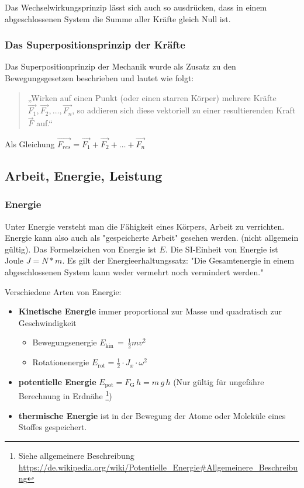\documentclass[../document.tex]{subfiles}
\begin{document}
Das Wechselwirkungsprinzip lässt sich auch so ausdrücken, dass in einem abgeschlossenen System die Summe aller Kräfte gleich Null ist.

\subsubsection {Das Superpositionsprinzip der Kräfte}

Das Superpositionprinzip der Mechanik wurde als Zusatz zu den Bewegungsgesetzen beschrieben und lautet wie folgt:

\begin{quote}
„Wirken auf einen Punkt (oder einen starren Körper) mehrere Kräfte ${\vec  {F_{1}}},{\vec  {F_{2}}},\dots,{\vec  {F_{n}}}$, so addieren sich diese vektoriell zu einer resultierenden Kraft ${\vec {F}}$ auf.“
\end{quote}

Als Gleichung $\vec{F_{{res}}}=\vec  {F_{1}}+\vec  {F_{2}}+\dots+\vec  {F_{n}}$


\subsection{Arbeit, Energie, Leistung}
\subsubsection{Energie}

Unter Energie versteht man die Fähigkeit eines Körpers, Arbeit zu verrichten. Energie kann also auch als "gespeicherte Arbeit" gesehen werden. (nicht allgemein gültig). Das Formelzeichen von Energie ist $E$. Die SI-Einheit von Energie ist Joule $J = N * m$. Es gilt der Energieerhaltungssatz: "Die Gesamtenergie in einem abgeschlossenen System kann weder vermehrt noch vermindert werden."

Verschiedene Arten von Energie:
\begin{itemize}
 \item \textbf{Kinetische Energie} immer proportional zur Masse und quadratisch zur Geschwindigkeit
 \begin{itemize}
  \item Bewegungsenergie $E_{\mathrm {kin} }\,=\,{\frac {1}{2}}mv^{2}\,$
  \item Rotationenergie  $E_{\mathrm {rot} }={\frac {1}{2}}\cdot J_{x}\cdot \omega ^{2}$
 \end{itemize}
 \item \textbf{potentielle Energie} $E_{{\mathrm  {pot}}}=F_{{\mathrm  G}}\,h=m\,g\,h$ (Nur gültig für ungefähre Berechnung in Erdnähe \footnote{Siehe allgemeinere Beschreibung \url{https://de.wikipedia.org/wiki/Potentielle\_Energie\#Allgemeinere\_Beschreibung}})
 \item \textbf{thermische Energie} ist in der Bewegung der Atome oder Moleküle eines Stoffes gespeichert. 
\end{itemize}
\end{document}
